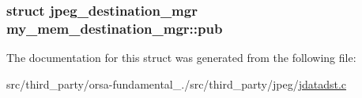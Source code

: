 \subsubsection[{pub}]{\setlength{\rightskip}{0pt plus 5cm}struct {\bf jpeg\+\_\+destination\+\_\+mgr} my\+\_\+mem\+\_\+destination\+\_\+mgr\+::pub}\label{structmy__mem__destination__mgr_a5e0cd1a96147d183b7338007a7716961}


The documentation for this struct was generated from the following file\+:\begin{DoxyCompactItemize}
\item 
src/third\+\_\+party/orsa-\/fundamental\+\_./src/third\+\_\+party/jpeg/\hyperlink{jdatadst_8c}{jdatadst.\+c}\end{DoxyCompactItemize}
